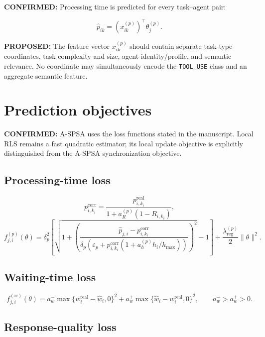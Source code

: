 \documentclass[11pt]{article}
\newcommand{\Confirmed}[1]{\par\noindent\textcolor{confirmed}{\textbf{CONFIRMED:} #1}\par}
\newcommand{\Proposal}[1]{\par\noindent\textcolor{proposal}{\textbf{PROPOSED:} #1}\par}
\begin{document}
\Confirmed{Processing time is predicted for every task--agent pair:}
\begin{equation}
 \widehat p_{ik}=(x_{ik}^{(p)})^\top\theta_j^{(p)}.
\end{equation}

\Proposal{The feature vector $x_{ik}^{(p)}$ should contain separate task-type
coordinates, task complexity and size, agent identity/profile, and semantic
relevance. No coordinate may simultaneously encode the \texttt{TOOL\_USE}
class and an aggregate semantic feature.}

\section{Prediction objectives}

\Confirmed{A-SPSA uses the loss functions stated in the manuscript. Local RLS
remains a fast quadratic estimator; its local update objective is explicitly
distinguished from the A-SPSA synchronization objective.}

\subsection{Processing-time loss}

\begin{equation}
p_{i,k_i}^{\mathrm{corr}}=
\frac{p_{i,k_i}^{\mathrm{real}}}
{1+a_R^{(p)}(1-R_{i,k_i})},
\end{equation}
\begin{equation}
f_{j,i}^{(p)}(\theta)=
\delta_p^2\left[
\sqrt{1+\left(
\frac{\widehat p_{j,i}-p_{i,k_i}^{\mathrm{corr}}}
{\delta_p\left(\varepsilon_p+p_{i,k_i}^{\mathrm{corr}}
\left(1+a_h^{(p)}h_i/h_{\max}\right)\right)}
\right)^2}-1\right]
+\frac{\lambda_{\mathrm{reg}}^{(p)}}2\lVert\theta\rVert^2.
\end{equation}

\subsection{Waiting-time loss}

\begin{equation}
f_{j,i}^{(w)}(\theta)=
a_w^-\max\{w_i^{\mathrm{real}}-\widehat w_i,0\}^2+
a_w^+\max\{\widehat w_i-w_i^{\mathrm{real}},0\}^2,
\qquad a_w^->a_w^+>0.
\end{equation}

\subsection{Response-quality loss}
\end{document}
